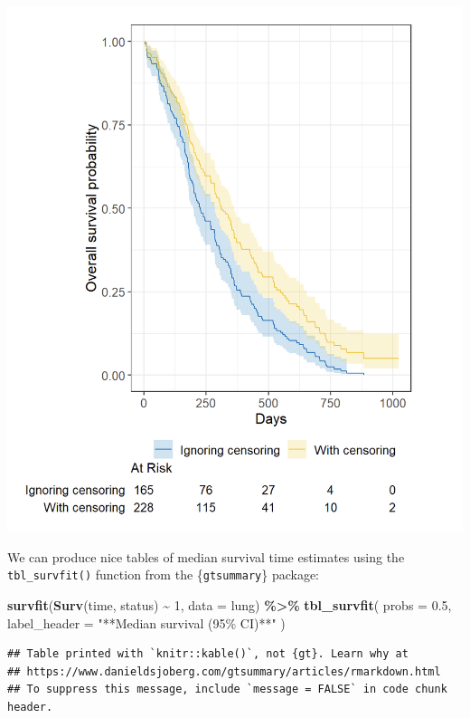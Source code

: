 \documentclass[
]{book}
\newenvironment{Shaded}{\begin{snugshade}}{\end{snugshade}}
\newcommand{\AttributeTok}[1]{\textcolor[rgb]{0.13,0.29,0.53}{#1}}
\newcommand{\DecValTok}[1]{\textcolor[rgb]{0.00,0.00,0.81}{#1}}
\newcommand{\FloatTok}[1]{\textcolor[rgb]{0.00,0.00,0.81}{#1}}
\newcommand{\FunctionTok}[1]{\textcolor[rgb]{0.13,0.29,0.53}{\textbf{#1}}}
\newcommand{\NormalTok}[1]{#1}
\newcommand{\SpecialCharTok}[1]{\textcolor[rgb]{0.81,0.36,0.00}{\textbf{#1}}}
\newcommand{\StringTok}[1]{\textcolor[rgb]{0.31,0.60,0.02}{#1}}
\begin{document}
\includegraphics{figs/survival6.png}

We can produce nice tables of median survival time estimates using the \texttt{tbl\_survfit()} function from the \{\texttt{gtsummary}\} package:

\begin{Shaded}
\begin{Highlighting}[]
\FunctionTok{survfit}\NormalTok{(}\FunctionTok{Surv}\NormalTok{(time, status) }\SpecialCharTok{\textasciitilde{}} \DecValTok{1}\NormalTok{, }\AttributeTok{data =}\NormalTok{ lung) }\SpecialCharTok{\%\textgreater{}\%} 
  \FunctionTok{tbl\_survfit}\NormalTok{(}
    \AttributeTok{probs =} \FloatTok{0.5}\NormalTok{,}
    \AttributeTok{label\_header =} \StringTok{"**Median survival (95\% CI)**"}
\NormalTok{  )}
\end{Highlighting}
\end{Shaded}

\begin{verbatim}
## Table printed with `knitr::kable()`, not {gt}. Learn why at
## https://www.danieldsjoberg.com/gtsummary/articles/rmarkdown.html
## To suppress this message, include `message = FALSE` in code chunk header.
\end{verbatim}
\end{document}
